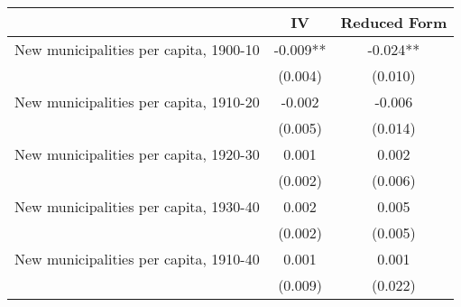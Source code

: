  \begin{tabular}{l*{2}{c}} \toprule
                &\multicolumn{1}{c}{IV}&\multicolumn{1}{c}{Reduced Form}\\
\midrule
New municipalities per capita, 1900-10&   -0.009** &   -0.024** \\
                &  (0.004)   &  (0.010)   \\
\addlinespace
New municipalities per capita, 1910-20&   -0.002   &   -0.006   \\
                &  (0.005)   &  (0.014)   \\
\addlinespace
New municipalities per capita, 1920-30&    0.001   &    0.002   \\
                &  (0.002)   &  (0.006)   \\
\addlinespace
New municipalities per capita, 1930-40&    0.002   &    0.005   \\
                &  (0.002)   &  (0.005)   \\
\addlinespace
New municipalities per capita, 1910-40&    0.001   &    0.001   \\
                &  (0.009)   &  (0.022)   \\
 \bottomrule \end{tabular}
